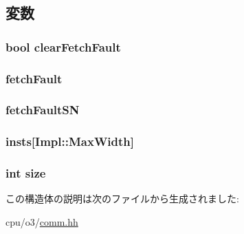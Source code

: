 \subsection{変数}
\hypertarget{structDefaultFetchDefaultDecode_a856dd3fa4ffcbaf645463aabe1876781}{
\subsubsection[{clearFetchFault}]{\setlength{\rightskip}{0pt plus 5cm}bool {\bf clearFetchFault}}}
\label{structDefaultFetchDefaultDecode_a856dd3fa4ffcbaf645463aabe1876781}
\hypertarget{structDefaultFetchDefaultDecode_ac2f4c2fc84b40d9abd220e8bd21242c9}{
\subsubsection[{fetchFault}]{ {\bf fetchFault}}}
\label{structDefaultFetchDefaultDecode_ac2f4c2fc84b40d9abd220e8bd21242c9}
\hypertarget{structDefaultFetchDefaultDecode_a6076715dd3cff9cb36f4ec6fea7b7297}{
\subsubsection[{fetchFaultSN}]{ {\bf fetchFaultSN}}}
\label{structDefaultFetchDefaultDecode_a6076715dd3cff9cb36f4ec6fea7b7297}
\hypertarget{structDefaultFetchDefaultDecode_a84958be72c3a0ec66109a9483e6c0331}{
\subsubsection[{insts}]{ {\bf insts}\mbox{[}Impl::MaxWidth\mbox{]}}}
\label{structDefaultFetchDefaultDecode_a84958be72c3a0ec66109a9483e6c0331}
\hypertarget{structDefaultFetchDefaultDecode_a439227feff9d7f55384e8780cfc2eb82}{
\subsubsection[{size}]{\setlength{\rightskip}{0pt plus 5cm}int {\bf size}}}
\label{structDefaultFetchDefaultDecode_a439227feff9d7f55384e8780cfc2eb82}


この構造体の説明は次のファイルから生成されました:\begin{DoxyCompactItemize}
\item 
cpu/o3/\hyperlink{o3_2comm_8hh}{comm.hh}\end{DoxyCompactItemize}
